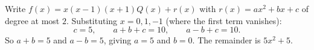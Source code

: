 Write $f(x)=x(x-1)(x+1)Q(x)+r(x)$ with $r(x)=ax^2+bx+c$ of degree at most $2$. Substituting $x=0,1,-1$ (where the first term vanishes):
\[c=5,\qquad a+b+c=10,\qquad a-b+c=10.\]
So $a+b=5$ and $a-b=5$, giving $a=5$ and $b=0$. The remainder is $\boxed{5x^2+5}$.
